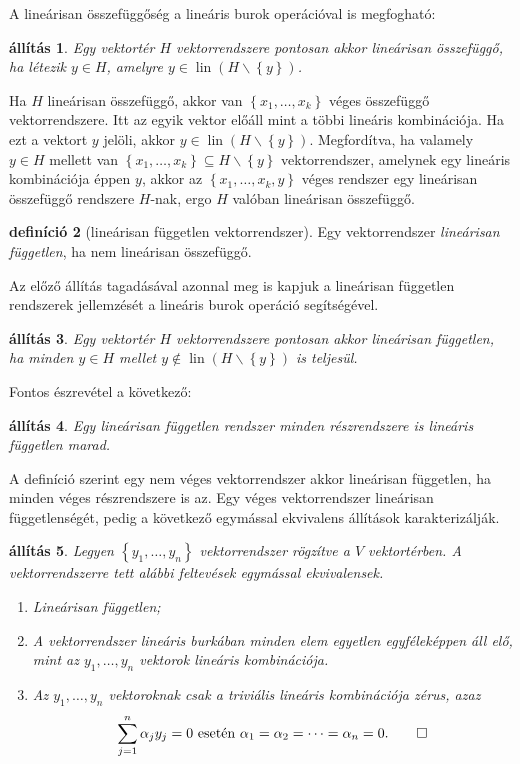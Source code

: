 \documentclass[9pt, a4paper, showtrims]{memoir}
\makeatletter
\renewenvironment{proof}[1][\proofname]
    {\par\pushQED{\qed}%
    \normalfont \topsep6\p@\@plus6\p@\relax
    \trivlist
    \item[\hskip\labelsep
        \itshape
    #1\@addpunct{:}]\ignorespaces}
    {\popQED\endtrivlist\@endpefalse}
\theoremstyle{plain}
\newtheorem{proposition}{állítás}[chapter]
\theoremstyle{remark}
\theoremstyle{definition}
\newtheorem{definition}[proposition]{definíció}
\DeclareMathOperator{\lin}{lin}
\makeatother
\begin{document}
A lineárisan összefüggőség a lineáris burok operációval is megfogható:
\begin{proposition}
    Egy vektortér $H$ vektorrendszere pontosan akkor lineárisan összefüggő, ha létezik $y\in H$, amelyre $y\in\lin(H\smallsetminus\left\{ y \right\})$.
\end{proposition}
\begin{proof}
    Ha $H$ lineárisan összefüggő, akkor van $\left\{ x_1,\ldots,x_k \right\}$ véges összefüggő vektorrendszere.
    Itt az egyik vektor előáll mint a többi lineáris kombinációja. 
    Ha ezt a vektort $y$ jelöli, akkor $y\in\lin\left( H\smallsetminus\left\{ y \right\} \right)$.
    Megfordítva, ha valamely $y\in H$ mellett van $\left\{ x_1,\ldots,x_k \right\}\subseteq H\smallsetminus\left\{ y \right\}$ vektorrendszer, amelynek egy lineáris kombinációja éppen $y$, 
    akkor az $\left\{ x_1,\ldots,x_k,y \right\}$ véges rendszer egy lineárisan összefüggő rendszere $H$-nak, ergo $H$ valóban lineárisan összefüggő.
\end{proof}
\begin{definition}[lineárisan független vektorrendszer]
	Egy vektorrendszer \emph{lineárisan független}, ha nem lineárisan összefüggő.
\end{definition}
Az előző állítás tagadásával azonnal meg is kapjuk a lineárisan független rendszerek jellemzését
a lineáris burok operáció segítségével.
\begin{proposition}
    Egy vektortér $H$ vektorrendszere pontosan akkor lineárisan független, ha minden $y\in H$ mellet $y\notin\lin(H\smallsetminus\left\{ y \right\})$ is teljesül.
\end{proposition}
Fontos észrevétel a következő:
\begin{proposition}
    Egy lineárisan független rendszer minden részrendszere is lineáris független marad.
\end{proposition}
A definíció szerint egy nem véges vektorrendszer akkor lineárisan független, ha minden véges részrendszere is az.
Egy véges vektorrendszer lineárisan függetlenségét, pedig a következő egymással ekvivalens állítások karakterizálják.
\begin{proposition}
	Legyen $\left\{ y_1,\ldots,y_n \right\}$ vektorrendszer rögzítve a $V$ vektortérben.
	A vektorrendszerre tett alábbi feltevések egymással ekvivalensek.
	\begin{enumerate}
		\item Lineárisan független;
		\item A vektorrendszer lineáris burkában minden elem egyetlen egyféleképpen áll elő,
		      mint az $y_1,\ldots,y_n$ vektorok lineáris kombinációja.
		\item Az $y_1,\ldots,y_n$ vektoroknak csak a \emph{triviális lineáris kombinációja} zérus,
		      azaz
		      \[
			      \sum_{j=1}^n\alpha_jy_j=0\text{ esetén }\alpha_1=\alpha_2=\dots=\alpha_n=0.\qedhere
		      \]
	\end{enumerate}
\end{proposition}
\end{document}
